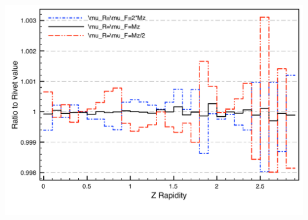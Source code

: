 \documentclass[10pt]{beamer}
\begin{document}
\begin{frame}
\includegraphics[width=0.45\paperwidth]{10MDYRatioScales_Plot.pdf}
\end{frame}

\end{document}
